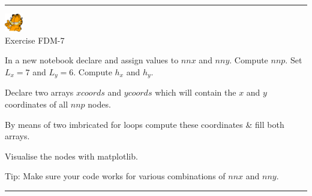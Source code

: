 \begin{center}
\begin{minipage}[t]{0.77\textwidth}
\par\noindent\rule{\textwidth}{0.4pt}

\begin{center}
\includegraphics[width=0.8cm]{images/garftr} \\
{\color{orange}Exercise FDM-7}
\end{center}

In a new notebook declare and assign values to 
$nnx$ and $nny$. Compute $nnp$.
Set $L_x=7$ and $L_y=6$. Compute $h_x$ and $h_y$.

Declare two arrays $xcoords$ and $ycoords$ which will 
contain the $x$ and $y$ coordinates of all $nnp$ nodes.

By means of two imbricated for loops
compute these coordinates \& fill both arrays. 

Visualise the nodes with matplotlib.

Tip: Make sure your code works for various 
combinations of $nnx$ and $nny$.

\par\noindent\rule{\textwidth}{0.4pt}
\end{minipage}
\end{center}






